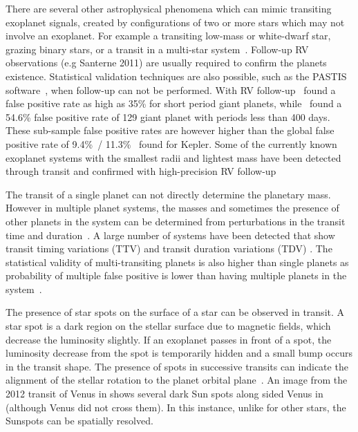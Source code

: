 There are several other astrophysical phenomena which can mimic transiting exoplanet signals, created by configurations of two or more stars which may not involve an exoplanet. 
For example a transiting low-mass or white-dwarf star, grazing binary stars, or a transit in a multi-star system~\citep[e.g.][]{Cameron 2012, Santerne 2013}.
Follow-up RV observations (e.g Santerne 2011) are usually required to confirm the planets existence. 
Statistical validation techniques are also possible, such as the PASTIS software~\cite{diaz_pastis_2014}, when follow-up can not be performed.
With RV follow-up~\citet{santerne_sophie_2012} found a false positive rate as high as 35\% for short period giant planets, while~\citet{santerne_2016} found a 54.6\% false positive rate of 129 giant planet with periods less than 400 days. These sub-sample false positive rates are however higher than the global false positive rate of 9.4\%~\citep{Fressin_false_2013}/ 11.3\%~\citep{santerne_contribution_2013} found for Kepler.
Some of the currently known exoplanet systems with the smallest radii and lightest mass have been detected through transit and confirmed with high-precision RV follow-up~\citep[e.g.][]{queloz_corot7_2009, pepe_earthsized_2013, lopez-morales_kepler21b_2016, ment_second_2018}

The transit of a single planet can not directly determine the planetary mass.
However in multiple planet systems, the masses and sometimes the presence of other planets in the system can be determined from perturbations in the transit time and duration~\citep[e.g.][]{holman_use_2005, holman_kepler9_2010}.
A large number of systems have been detected that show transit timing variations (TTV) and transit duration variations (TDV) \citep[e.g.][]{holczer_transit_2016}.
The statistical validity of multi-transiting planets is also higher than single planets as probability of multiple false positive is lower than having multiple planets in the system~\citet{lissauer_almost_2012}.

The presence of star spots on the surface of a star can be observed in transit.
A star spot is a dark region on the stellar surface due to magnetic fields, which decrease the luminosity slightly.
If an exoplanet passes in front of a spot, the luminosity decrease from the spot is temporarily hidden and a small bump occurs in the transit shape.
The presence of spots in successive transits can indicate the alignment of the stellar rotation to the planet orbital plane~\citet{Sanchis-Ojeda et al 2012}.
An image from the 2012 transit of Venus in shows several dark Sun spots along sided Venus in  (although Venus did not cross them).
In this instance, unlike for other stars, the Sunspots can be spatially resolved.

